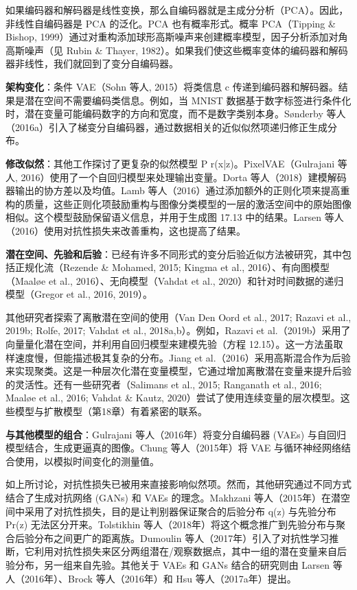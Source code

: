 如果编码器和解码器是线性变换，那么自编码器就是主成分分析（PCA）。因此，非线性自编码器是 PCA 的泛化。PCA 也有概率形式。概率 PCA（Tipping \& Bishop, 1999）通过对重构添加球形高斯噪声来创建概率模型，因子分析添加对角高斯噪声（见 Rubin \& Thayer, 1982）。如果我们使这些概率变体的编码器和解码器非线性，我们就回到了变分自编码器。

\textbf{架构变化}：条件 VAE（Sohn 等人, 2015）将类信息 c 传递到编码器和解码器。结果是潜在空间不需要编码类信息。例如，当 MNIST 数据基于数字标签进行条件化时，潜在变量可能编码数字的方向和宽度，而不是数字类别本身。Sønderby 等人（2016a）引入了梯变分自编码器，通过数据相关的近似似然项递归修正生成分布。

\textbf{修改似然}：其他工作探讨了更复杂的似然模型 P r(x|z)。PixelVAE（Gulrajani 等人, 2016）使用了一个自回归模型来处理输出变量。Dorta 等人（2018）建模解码器输出的协方差以及均值。Lamb 等人（2016）通过添加额外的正则化项来提高重构的质量，这些正则化项鼓励重构与图像分类模型的一层的激活空间中的原始图像相似。这个模型鼓励保留语义信息，并用于生成图 17.13 中的结果。Larsen 等人（2016）使用对抗性损失来改善重构，这也提高了结果。

\textbf{潜在空间、先验和后验}：已经有许多不同形式的变分后验近似方法被研究，其中包括正规化流（Rezende \& Mohamed, 2015; Kingma et al., 2016）、有向图模型（Maaløe et al., 2016）、无向模型（Vahdat et al., 2020）和针对时间数据的递归模型（Gregor et al., 2016, 2019）。

其他研究者探索了离散潜在空间的使用（Van Den Oord et al., 2017; Razavi et al., 2019b; Rolfe, 2017; Vahdat et al., 2018a,b）。例如，Razavi et al.（2019b）采用了向量量化潜在空间，并利用自回归模型来建模先验（方程 12.15）。这一方法虽取样速度慢，但能描述极其复杂的分布。Jiang et al.（2016）采用高斯混合作为后验来实现聚类。这是一种层次化潜在变量模型，它通过增加离散潜在变量来提升后验的灵活性。还有一些研究者（Salimans et al., 2015; Ranganath et al., 2016; Maaløe et al., 2016; Vahdat \& Kautz, 2020）尝试了使用连续变量的层次模型。这些模型与扩散模型（第18章）有着紧密的联系。


\textbf{与其他模型的组合}：Gulrajani 等人（2016年）将变分自编码器 (VAEs) 与自回归模型结合，生成更逼真的图像。Chung 等人（2015年）将 VAE 与循环神经网络结合使用，以模拟时间变化的测量值。

如上所讨论，对抗性损失已被用来直接影响似然项。然而，其他研究通过不同方式结合了生成对抗网络 (GANs) 和 VAEs 的理念。Makhzani 等人（2015年）在潜空间中采用了对抗性损失，目的是让判别器保证聚合的后验分布 q(z) 与先验分布 Pr(z) 无法区分开来。Tolstikhin 等人（2018年）将这个概念推广到先验分布与聚合后验分布之间更广的距离族。Dumoulin 等人（2017年）引入了对抗性学习推断，它利用对抗性损失来区分两组潜在/观察数据点，其中一组的潜在变量来自后验分布，另一组来自先验。其他关于 VAEs 和 GANs 结合的研究则由 Larsen 等人（2016年）、Brock 等人（2016年）和 Hsu 等人（2017a年）提出。

